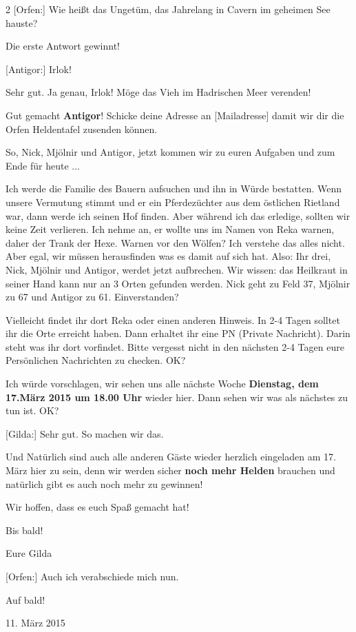 \documentclass[10pt, a4paper, oneside]{book}
\begin{document}
\begin{multicols}{2}
[Orfen:] Wie heißt das Ungetüm, das Jahrelang in Cavern im geheimen See hauste?

Die erste Antwort gewinnt!

[Antigor:] Irlok!

Sehr gut. Ja genau, Irlok! Möge das Vieh im Hadrischen Meer verenden!

Gut gemacht \textbf{Antigor}! Schicke deine Adresse an [Mailadresse] damit wir dir die Orfen Heldentafel zusenden können.

So, Nick, Mjölnir und Antigor, jetzt kommen wir zu euren Aufgaben und zum Ende für heute ...

Ich werde die Familie des Bauern aufsuchen und ihn in Würde bestatten. Wenn unsere Vermutung stimmt und er ein Pferdezüchter aus dem östlichen Rietland war, dann werde ich seinen Hof finden. Aber während ich das erledige, sollten wir keine Zeit verlieren. Ich nehme an, er wollte uns im Namen von Reka warnen, daher der Trank der Hexe. Warnen vor den Wölfen? Ich verstehe das alles nicht. Aber egal, wir müssen herausfinden was es damit auf sich hat. Also: Ihr drei, Nick, Mjölnir und Antigor, werdet jetzt aufbrechen. Wir wissen: das Heilkraut in seiner Hand kann nur an 3 Orten gefunden werden. Nick geht zu Feld 37, Mjölnir zu 67 und Antigor zu 61. Einverstanden?

Vielleicht findet ihr dort Reka oder einen anderen Hinweis. In 2-4 Tagen solltet ihr die Orte erreicht haben. Dann erhaltet ihr eine PN (Private Nachricht). Darin steht was ihr dort vorfindet. Bitte vergesst nicht in den nächsten 2-4 Tagen eure Persönlichen Nachrichten zu checken. OK?

Ich würde vorschlagen, wir sehen uns alle nächste Woche \textbf{Dienstag, dem 17.März 2015 um 18.00 Uhr} wieder hier. Dann sehen wir was als nächstes zu tun ist. OK?

[Gilda:] Sehr gut. So machen wir das.

Und Natürlich sind auch alle anderen Gäste wieder herzlich eingeladen am 17. März hier zu sein, denn wir werden sicher \textbf{noch mehr Helden} brauchen und natürlich gibt es auch noch mehr zu gewinnen!

Wir hoffen, dass es euch Spaß gemacht hat!

Bis bald!

Eure Gilda

[Orfen:] Auch ich verabschiede mich nun.

Auf bald!

\begin{center}
    11. März 2015
\end{center}




\end{multicols}
\end{document}
